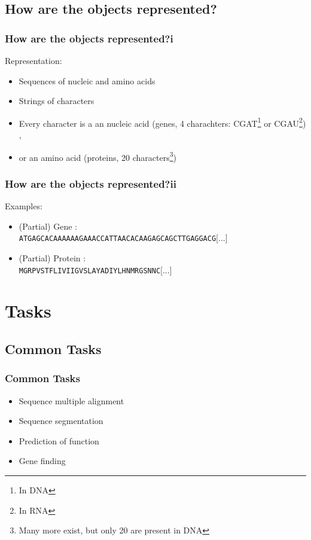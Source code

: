\documentclass[11pt]{beamer}
\begin{document}
    \subsection{How are the objects represented?}
    \begin{frame}
        \frametitle{How are the objects represented?\quad i}
        Representation:
        \begin{itemize}
            \item Sequences of nucleic and amino acids
            \item Strings of characters
            \item Every character is a an nucleic acid (genes, 4 charachters: CGAT\footnote{In DNA} or CGAU\footnote{In RNA}) \cite{cristianini2006introduction},
            \item or an amino acid (proteins, 20 characters\footnote{Many more exist, but only 20 are present in DNA}) \cite{cristianini2006introduction}
        \end{itemize}
    \end{frame}
    \begin{frame}
        \frametitle{How are the objects represented?\quad ii}
        Examples:
        \begin{itemize}
            \item (Partial) Gene \cite{finn2016pfam}:\\
            \texttt{ATGAGCACAAAAAAGAAACCATTAACACAAGAGCAGCTTGAGGACG}[...]
            \item (Partial) Protein \cite{finn2016pfam}:\\
            \texttt{MGRPVSTFLIVIIGVSLAYADIYLHNMRGSNNC}[...]
        \end{itemize}
    \end{frame}

    \section{Tasks}
    \subsection{Common Tasks}
    \begin{frame}
        \frametitle{Common Tasks}
        \begin{itemize}
            \item Sequence multiple alignment
            \item Sequence segmentation
            \item Prediction of function
            \item Gene finding
        \end{itemize}
    \end{frame}
\end{document}

